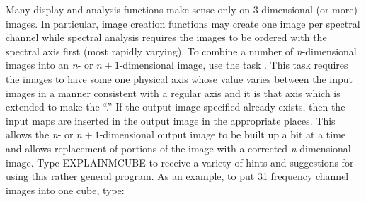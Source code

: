      Many  display and analysis functions make
sense only on 3-dimensional (or more) images.  In particular, image
creation functions may create one image per spectral channel while
spectral analysis requires the images to be ordered with the spectral
axis first (most rapidly varying).  To combine a number of
{\it n\/}-dimensional images into an {\it n\/}- or $n+1$-dimensional
image, use the task {\tt {}}\@.  This task requires the
images to have some one physical axis whose value varies between the
input images in a manner consistent with a regular axis and it is that
axis which is extended to make the ``.''  If the output
image specified already exists, then the input maps are inserted in
the output image in the appropriate places.  This allows the {\it
n\/}- or $n+1$-dimensional output image to be built up a bit at a time
and allows replacement of portions of the image with a corrected {\it
n\/}-dimensional image.  Type {\us EXPLAIN\qs MCUBE \CR} to receive a
variety of hints and suggestions for using this rather general
program.  As an example, to put 31 frequency channel images into one
cube, type:

